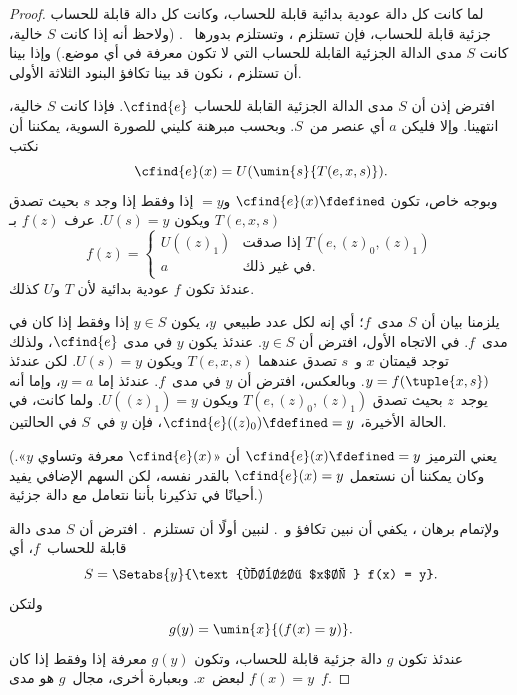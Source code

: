 \documentclass[../../../include/open-logic-section]{subfiles}
\begin{document}
\begin{proof}
لما كانت كل دالة عودية بدائية قابلة للحساب، وكانت كل دالة قابلة للحساب
جزئية قابلة للحساب، فإن  تستلزم
، وتستلزم  بدورها
~. (ولاحظ أنه إذا كانت $S$ خالية، كانت $S$ مدى الدالة
الجزئية القابلة للحساب التي لا تكون معرفة في أي موضع.) وإذا بينا أن
 تستلزم ، نكون قد بينا تكافؤ
البنود الثلاثة الأولى.

افترض إذن أن $S$ مدى الدالة الجزئية القابلة للحساب $\cfind{e}$. فإذا
كانت $S$ خالية، انتهينا. وإلا فليكن $a$ أي عنصر من~$S$. وبحسب مبرهنة
كليني للصورة السوية، يمكننا أن نكتب
\[
\cfind{e}(x) = U(\umin{s}{T(e, x, s)}).
\]
وبوجه خاص، تكون $\cfind{e}(x)\fdefined$ و$=y$ إذا وفقط إذا وجد $s$
بحيث تصدق $T(e,x,s)$ ويكون $U(s)=y$. عرف $f(z)$ بـ
\[
f(z) = \begin{cases}
  U((z)_1) & \text{إذا صدقت $T(e, (z)_0, (z)_1)$} \\
  a        & \text{في غير ذلك.}
\end{cases}
\]
عندئذ تكون $f$ عودية بدائية لأن $T$ و$U$ كذلك.


يلزمنا بيان أن $S$ مدى~$f$؛ أي إنه لكل عدد طبيعي~$y$، يكون $y\in S$
إذا وفقط إذا كان في مدى~$f$. في الاتجاه الأول، افترض أن $y\in S$.
عندئذ يكون $y$ في مدى $\cfind{e}$، ولذلك توجد قيمتان $x$ و~$s$ تصدق
عندهما $T(e,x,s)$ ويكون $U(s)=y$. لكن عندئذ
$y=f(\tuple{x,s})$. وبالعكس، افترض أن $y$ في مدى~$f$. عندئذ إما
$y=a$، وإما أنه يوجد~$z$ بحيث تصدق $T(e,(z)_0,(z)_1)$ ويكون
$U((z)_1)=y$. ولما كانت، في الحالة الأخيرة،
$\cfind{e}((z)_0)\fdefined=y$، فإن $y$ في~$S$ في الحالتين.

(يعني الترميز $\cfind{e}(x)\fdefined=y$ أن «$\cfind{e}(x)$ معرفة
وتساوي $y$». وكان يمكننا أن نستعمل $\cfind{e}(x)=y$ بالقدر نفسه، لكن
السهم الإضافي يفيد أحيانًا في تذكيرنا بأننا نتعامل مع دالة جزئية.)

ولإتمام برهان ، يكفي أن نبين تكافؤ
 و~. لنبين أولًا أن
 تستلزم~. افترض أن $S$ مدى دالة
قابلة للحساب~$f$، أي
\[
S = \Setabs{y}{\text{لبعض $x$، } f(x) = y}.
\]
ولتكن
\[
g(y) = \umin{x}{(f(x) = y)}.
\]
عندئذ تكون $g$ دالة جزئية قابلة للحساب، وتكون $g(y)$ معرفة إذا وفقط
إذا كان $f(x)=y$ لبعض~$x$. وبعبارة أخرى، مجال~$g$ هو مدى~$f$.


\end{proof}
\end{document}
